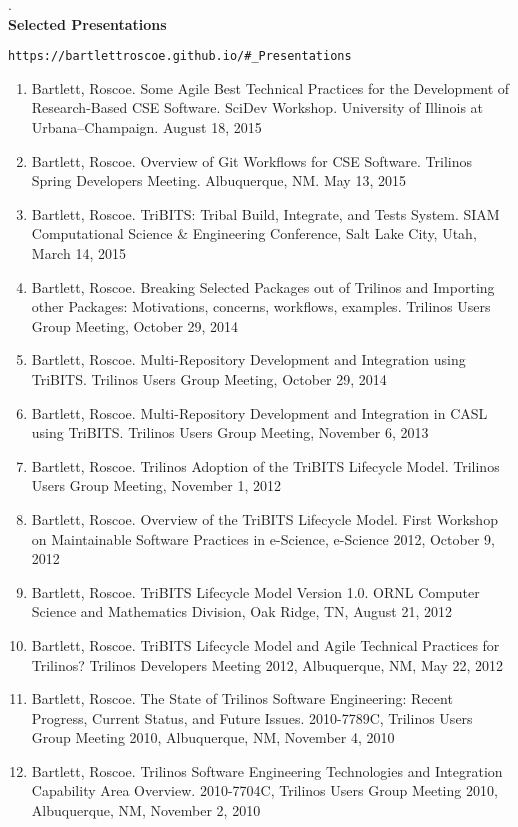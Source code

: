 \documentclass{report}
\newcommand{\sectitlevs}{1.2ex}
\newcommand{\secendvs}{1.5ex}
\newcommand{\indentone}{0.5in}
\newcommand{\widthone}{6.4in}
\newcommand{\pboxone}{\hspace*{\indentone}\parbox[t]{\widthone}}
\begin{document}
%
{\tiny .}\\[\secendvs]
%
%
{}\textbf{\Large Selected Presentations} \\ [\sectitlevs]
%
\pboxone{\texttt{https://bartlettroscoe.github.io/\#\_Presentations}}
%
\begin{enumerate}
%
{}\item Bartlett, Roscoe. Some Agile Best Technical Practices for the Development of Research-Based CSE Software. SciDev Workshop. University of Illinois at Urbana–Champaign. August 18, 2015
%
{}\item Bartlett, Roscoe. Overview of Git Workflows for CSE Software.  Trilinos Spring Developers Meeting.  Albuquerque, NM.  May 13, 2015
%
{}\item Bartlett, Roscoe. TriBITS: Tribal Build, Integrate, and Tests System.  SIAM Computational Science \& Engineering Conference, Salt Lake City, Utah, March 14, 2015
%
{}\item Bartlett, Roscoe. Breaking Selected Packages out of Trilinos and Importing other Packages: Motivations, concerns, workflows, examples.  Trilinos Users Group Meeting, October 29, 2014
%
{}\item Bartlett, Roscoe. Multi-Repository Development and Integration using TriBITS.  Trilinos Users Group Meeting, October 29, 2014
%
{}\item Bartlett, Roscoe. Multi-Repository Development and Integration in CASL using TriBITS.  Trilinos Users Group Meeting, November 6, 2013
%
{}\item Bartlett, Roscoe. Trilinos Adoption of the TriBITS Lifecycle Model.  Trilinos Users Group Meeting, November 1, 2012
%
{}\item Bartlett, Roscoe. Overview of the TriBITS Lifecycle Model.  First Workshop on Maintainable Software Practices in e-Science, e-Science 2012, October 9, 2012
%
{}\item Bartlett, Roscoe. TriBITS Lifecycle Model Version 1.0.  ORNL Computer Science and Mathematics Division, Oak Ridge, TN, August 21, 2012
%
{}\item Bartlett, Roscoe. TriBITS Lifecycle Model and Agile Technical Practices for Trilinos?  Trilinos Developers Meeting 2012, Albuquerque, NM, May 22, 2012
%
{}\item Bartlett, Roscoe. The State of Trilinos Software Engineering: Recent Progress, Current Status, and Future Issues.  2010-7789C, Trilinos Users Group Meeting 2010, Albuquerque, NM, November 4, 2010
%
{}\item Bartlett, Roscoe. Trilinos Software Engineering Technologies and Integration Capability Area Overview.  2010-7704C, Trilinos Users Group Meeting 2010, Albuquerque, NM, November 2, 2010

\end{enumerate}
\end{document}
